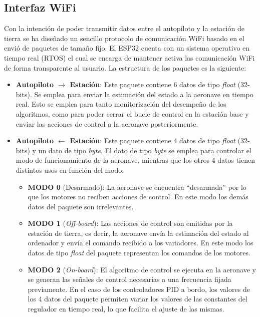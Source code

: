 \subsection{Interfaz WiFi}
	Con la intención de poder transmitir datos entre el autopiloto y la estación de tierra se ha diseñado un sencillo protocolo de comunicación WiFi basado en el envió de paquetes de tamaño fijo. El ESP32 cuenta con un sistema operativo en tiempo real (RTOS) el cual se encarga de mantener activa las comunicación WiFi de forma transparente al usuario. La estructura de los paquetes es la siguiente:
	
	\begin{itemize}
		\item \textbf{Autopiloto $\rightarrow$ Estación}: Este paquete contiene 6 datos de tipo \textit{float} (32-bits). Se emplea para enviar la estimación del estado a la aeronave en tiempo real. Esto se emplea para tanto monitorización del desempeño de los algoritmos, como para poder cerrar el bucle de control en la estación base y enviar las acciones de control a la aeronave posteriormente. 
		\item \textbf{Autopiloto $\leftarrow$ Estación}: Este paquete contiene 4 datos de tipo \textit{float} (32-bits) y un dato de tipo \textit{byte}. El dato de tipo \textit{byte} se emplea para controlar el modo de funcionamiento de la aeronave, mientras que los otros 4 datos tienen distintos usos en función del modo:
		
		\begin{itemize}
			\item \textbf{MODO 0} (Desarmado): La aeronave se encuentra ``desarmada'' por lo que los motores no reciben acciones de control. En este modo los demás datos del paquete son irrelevantes.
			
			\item \textbf{MODO 1} (\textit{Off-board}): Las acciones de control son emitidas por la estación de tierra, es decir, la aeronave envía la estimación del estado al ordenador y envía el comando recibido a los variadores. En este modo los datos de tipo \textit{float} del paquete representan los comandos de los motores.
			
			\item \textbf{MODO 2} (\textit{On-board}): El algoritmo de control se ejecuta en la aeronave y se generan las señales de control necesarias a una frecuencia  fijada previamente. En el caso de los controladores PID a bordo, los valores de los 4 datos del paquete permiten variar los valores de las constantes del regulador en tiempo real, lo que facilita el ajuste de las mismas.
		\end{itemize}
		
	\end{itemize}

